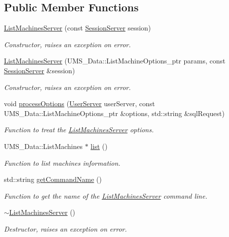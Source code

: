 \subsection*{Public Member Functions}
\begin{DoxyCompactItemize}
\item 
\hyperlink{classListMachinesServer_ab887eeeb9276a22e5c7fd7b69b0a50d9}{ListMachinesServer} (const \hyperlink{classSessionServer}{SessionServer} session)
\begin{DoxyCompactList}\small\item\em Constructor, raises an exception on error. \item\end{DoxyCompactList}\item 
\hyperlink{classListMachinesServer_afe22244c6bdf4340e37e459623a16f9c}{ListMachinesServer} (UMS\_\-Data::ListMachineOptions\_\-ptr params, const \hyperlink{classSessionServer}{SessionServer} \&session)
\begin{DoxyCompactList}\small\item\em Constructor, raises an exception on error. \item\end{DoxyCompactList}\item 
void \hyperlink{classListMachinesServer_ab89cbee53dab824f863b166836b29ac4}{processOptions} (\hyperlink{classUserServer}{UserServer} userServer, const UMS\_\-Data::ListMachineOptions\_\-ptr \&options, std::string \&sqlRequest)
\begin{DoxyCompactList}\small\item\em Function to treat the \hyperlink{classListMachinesServer}{ListMachinesServer} options. \item\end{DoxyCompactList}\item 
UMS\_\-Data::ListMachines $\ast$ \hyperlink{classListMachinesServer_abbaceb388d6ad47bc9e82a3f33e978a3}{list} ()
\begin{DoxyCompactList}\small\item\em Function to list machines information. \item\end{DoxyCompactList}\item 
std::string \hyperlink{classListMachinesServer_a1009395b555efa83eac39fa139a3625b}{getCommandName} ()
\begin{DoxyCompactList}\small\item\em Function to get the name of the \hyperlink{classListMachinesServer}{ListMachinesServer} command line. \item\end{DoxyCompactList}\item 
\hypertarget{classListMachinesServer_a0ef08a4f9de02a0a4e1941cf2c5c9c80}{
\hyperlink{classListMachinesServer_a0ef08a4f9de02a0a4e1941cf2c5c9c80}{$\sim$ListMachinesServer} ()}
\label{classListMachinesServer_a0ef08a4f9de02a0a4e1941cf2c5c9c80}

\begin{DoxyCompactList}\small\item\em Destructor, raises an exception on error. \item\end{DoxyCompactList}\end{DoxyCompactItemize}
